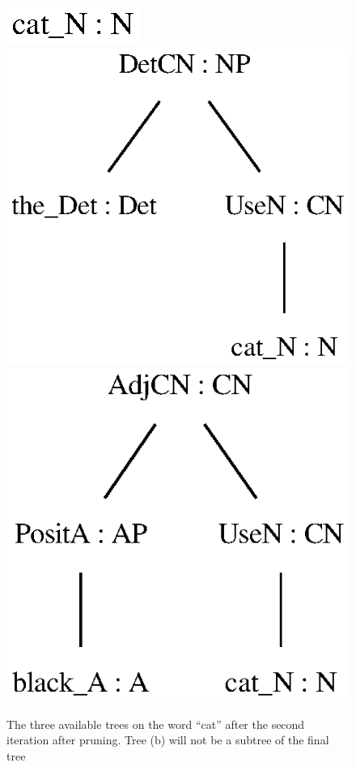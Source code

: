 \begin{figure}[H]
    \centering
        {\includegraphics[scale=0.75]{thesis/figure/black_cats/cat_N_gf.eps}}
        {\includegraphics[scale=0.75]{thesis/figure/black_cats/the_cat_NP_gf.eps}}
        {\includegraphics[scale=0.75]{thesis/figure/black_cats/black_cat_CN_gf.eps}}
    \caption{The three available trees on the word ``cat'' after the second iteration after pruning. Tree (b) will not be a subtree of the final tree}\label{fig:cat iter 2 pruned}
\end{figure}

